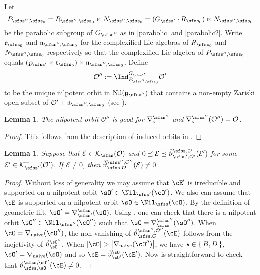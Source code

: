\documentclass[12pt,a4paper]{amsart}
\def\abs#1{\left|{#1}\right|}
\newcommand{\CE}{{\mathcal {E}}}
\newcommand{\CK}{{\mathcal {K}}}
\newcommand{\CO}{{\mathcal {O}}}
\newcommand{\g}{\mathfrak g}
\def\DD{\nabla}
\numberwithin{equation}{section}
\newtheorem{lem}[thm]{Lemma}
\theoremstyle{remark}
\def\DDn{\DD_{\mathrm{naive}}}
\begin{document}
Let
\[
  P_{\sfss'',\sfss_0}=R_{\sfss'',\sfss_0}\ltimes N_{\sfss'',\sfss_0}=(G_{\sfss'}\cdot R_{\sfss_0})\ltimes N_{\sfss'',\sfss_0}
\]
be the parabolic subgroup of $G_{\sfss''}$ as in \eqref{parabolic} and \eqref{parabolic2}. Write $\mathfrak r_{\sfss_0}$ and $\mathfrak n_{\sfss'',\sfss_0}$ for the complexified Lie algebras of $R_{\sfss_0}$ and $N_{\sfss'',\sfss_0}$ respectively so that  the complexified Lie algebra of $P_{\sfss'', \sfss_0}$ equals $(\g_{\sfss'}\times \mathfrak r_{\sfss_0})\ltimes \mathfrak n_{\sfss'',\sfss_0}$.
Define
\[
  \CO'':= \Ind_{P_{\sfss'',\sfss_0}}^{G_{\sfss''}}  \CO'%
\]
to be the unique nilpotent orbit in $\mathrm{Nil}(\g_{\sfss''})$ that contains a non-empty Zariski open subset of  $
  \CO'+\mathfrak n_{\sfss'',\sfss_0}$ (see \cite[Theorem 7.1.1]{CM}).


\begin{lem}
The nilpotent orbit $\CO''$ is good for  $\nabla_\mathsf s^{\sfss''}$ and $\nabla_\mathsf s^{\sfss''}(\CO'')=\CO$.
\end{lem}
\begin{proof}
This follows from the description of induced orbits in \cite[Section 7.3]{CM}.
\end{proof}


\begin{lem}\label{lem74}
Suppose that $\CE\in \CK_{\sfss}(\CO)$ and $0\preceq \CE\preceq \check \vartheta_{\sfss', \CO'}^{\sfss, \CO}(\CE')$ for some $\CE'\in \CK^+_{\sfss'}(\CO')$. If $\CE\neq 0$, then  $\check \vartheta_{\sfss, \CO}^{\sfss'', \CO''}(\CE)\neq 0$.
\end{lem}
\begin{proof}
  Without loss of generality we may assume that $\cE'$ is irreducible and
  supported on a nilpotent orbit $\sO'\in \Nil_{\sfss'}(\cO')$.
  We also can assume that $\cE$ is supported on a nilpotent orbit $\sO\in \Nil_\sfss(\cO)$.
  By the definition of geometric lift, $\sO'=\DDss(\sO)$. Using ,
  one can check that there is a nilpotent orbit $\sO''\in \Nil_{\sfss''}(\cO'')$ such that
  $\sO = \DD_{\sfss}^{\sfss''}(\sO'')$.
  When $\cO = \DDn(\cO'')$, the non-vanishing of $\check \vartheta_{\sfss, \CO}^{\sfss'', \CO''}(\cE)$
  follows from the inejctivity of $\dlift_{\sO}^{\sO''}$.
  When $\abs{\cO} > \abs{\DDn(\cO'')}$, we have $\star \in \set{B,D}$, $\sO'=\DDn(\sO)$
  and so $\cE = \dlift_{\sO'}^{\sO}(\cE')$.
  Now is straightforward to check that $\vartheta_{\sfss,\sO}^{\sfss,\sO''}(\cE) \neq 0$.
\end{proof}
\end{document}

